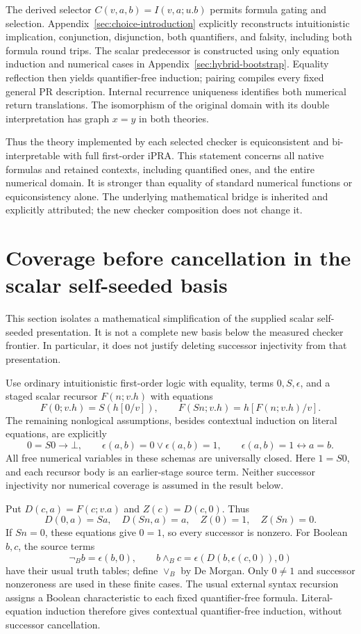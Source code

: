 \documentclass[11pt]{article}
\theoremstyle{definition}\newtheorem{definition}[theorem]{Definition}
\begin{document}
The derived selector $C(v,a,b)=I(v,a;u.b)$ permits formula gating and
selection. Appendix~\ref{sec:choice-introduction} explicitly reconstructs
intuitionistic implication, conjunction, disjunction, both quantifiers,
and falsity, including both formula round trips. The scalar predecessor
is constructed using only equation induction and numerical cases in
Appendix~\ref{sec:hybrid-bootstrap}. Equality reflection then yields
quantifier-free induction; pairing compiles every fixed general PR
description. Internal recurrence uniqueness identifies both numerical
return translations. The isomorphism of the original domain with its
double interpretation has graph $x=y$ in both theories.

Thus the theory implemented by each selected checker is equiconsistent
and bi-interpretable with full first-order iPRA. This statement concerns
all native formulas and retained contexts, including quantified ones,
and the entire numerical domain. It is stronger than equality of standard
numerical functions or equiconsistency alone. The underlying mathematical
bridge is inherited and explicitly attributed; the new checker composition
does not change it.

\section{Coverage before cancellation in the scalar self-seeded basis}
\label{sec:coverage-no-cancellation}

This section isolates a mathematical simplification of the supplied
scalar self-seeded presentation. It is not a complete new basis below
the measured checker frontier. In particular, it does not justify
deleting successor injectivity from that presentation.

Use ordinary intuitionistic first-order logic with equality, terms
$0,S,\epsilon$, and a staged scalar recursor $F(n;v.h)$ with equations
\[
 F(0;v.h)=S(h[0/v]),\qquad
 F(Sn;v.h)=h[F(n;v.h)/v].
\]
The remaining nonlogical assumptions, besides contextual induction on
literal equations, are explicitly
\[
 0=S0\to\bot,\qquad
 \epsilon(a,b)=0\lor\epsilon(a,b)=1,\qquad
 \epsilon(a,b)=1\leftrightarrow a=b.
\]
All free numerical variables in these schemas are universally closed. Here $1=S0$, and each recursor body is an earlier-stage
source term. Neither successor injectivity nor numerical coverage is
assumed in the result below.

Put $D(c,a)=F(c;v.a)$ and $Z(c)=D(c,0)$. Thus
\[
 D(0,a)=Sa,\quad D(Sn,a)=a,\quad Z(0)=1,\quad Z(Sn)=0.
\]
If $Sn=0$, these equations give $0=1$, so every successor is nonzero.
For Boolean $b,c$, the source terms
\[
 \neg_Bb=\epsilon(b,0),\qquad
 b\wedge_Bc=\epsilon(D(b,\epsilon(c,0)),0)
\]
have their usual truth tables; define $\vee_B$ by De Morgan. Only
$0\ne1$ and successor nonzeroness are used in these finite cases.
The usual external syntax recursion assigns a Boolean characteristic
to each fixed quantifier-free formula. Literal-equation induction
therefore gives contextual quantifier-free induction, without
successor cancellation.
\end{document}
